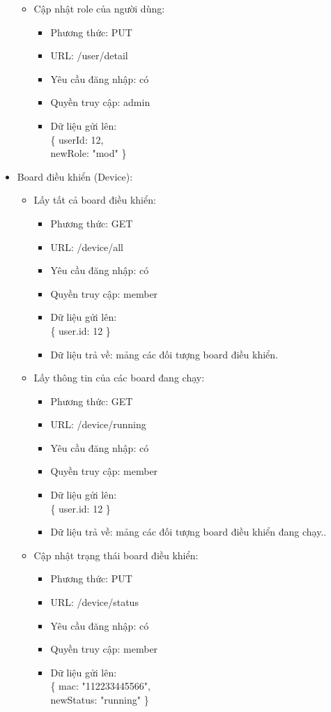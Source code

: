 \documentclass[a4paper,12pt,oneside]{article}
\begin{document}
\begin{itemize}
\begin{itemize}
\item Cập nhật role của người dùng:
	\begin{itemize}
	\item Phương thức: PUT
	\item URL: /user/detail
	\item Yêu cầu đăng nhập: có
	\item Quyền truy cập: admin
	\item Dữ liệu gửi lên:\\ 
		\{
  			userId: 12, \\
  			newRole: "mod"
		\}
	\end{itemize}

\end{itemize}

\item Board điều khiển (Device):
\begin{itemize}
\item Lấy tất cả board điều khiển:
	\begin{itemize}
	\item Phương thức: GET
	\item URL: /device/all
	\item Yêu cầu đăng nhập: có
	\item Quyền truy cập: member
	\item Dữ liệu gửi lên:\\ 
		\{
  			user.id: 12
  		\}
  	\item Dữ liệu trả về: mảng các đối tượng board điều khiển.
	\end{itemize} 

\item Lấy thông tin của các board đang chạy:
	\begin{itemize}
	\item Phương thức: GET
	\item URL: /device/running
	\item Yêu cầu đăng nhập: có
	\item Quyền truy cập: member
	\item Dữ liệu gửi lên:\\ 
		\{
  			user.id: 12
  		\}
  	\item Dữ liệu trả về: mảng các đối tượng board điều khiển đang chạy..
	\end{itemize} 
	
\item Cập nhật trạng thái board điều khiển:
	\begin{itemize}
	\item Phương thức: PUT
	\item URL: /device/status
	\item Yêu cầu đăng nhập: có
	\item Quyền truy cập: member
	\item Dữ liệu gửi lên:\\ 
		\{
  			mac: "112233445566",\\
  			newStatus: "running"
  		\}
	\end{itemize} 
	

\end{itemize}
\end{itemize}
\end{document}
